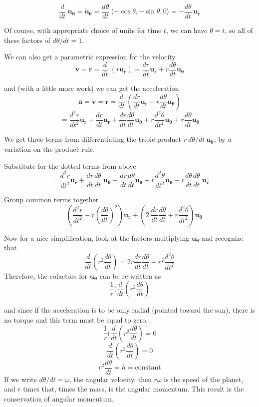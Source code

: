 \documentclass[11pt, oneside]{article}
\begin{document}
\[ \frac{d}{dt} \ \mathbf{u_{\theta}} = \dot{\mathbf{u}}_\mathbf{\theta} =  \frac{d\theta}{dt} \ \langle -\cos \theta, -\sin \theta, 0 \rangle = - \frac{d\theta}{dt} \ \mathbf{u_r} \]

Of course, with appropriate choice of units for time $t$, we can have $\theta = t$, so all of these factors of $d \theta/dt = 1$.

We can also get a parametric expression for the velocity
\[ \mathbf{v} = \dot{\mathbf{r}} = \frac{d}{dt} \ (r \mathbf{u_r}) = \frac{dr}{dt} \mathbf{u_r} + r \frac{d \theta}{dt}  \mathbf{u_{\theta}} \]

 and (with a little more work) we can get the acceleration
 \[ \mathbf{a} = \dot{\mathbf{v}} = \ddot{\mathbf{r}} = \frac{d}{dt} \ (\frac{dr}{dt} \mathbf{u_r} + r \frac{d \theta}{dt}  \mathbf{u_{\theta}}) \]
 \[ = \frac{d^2r}{dt^2} \mathbf{u_r} + \frac{dr}{dt} \dot{\mathbf{u}}_\mathbf{r} + \frac{dr}{dt} \frac{d \theta}{dt}  \mathbf{u_{\theta}} + r \frac{d^2\theta}{dt^2} \mathbf{u_{\theta}} + r \frac{d\theta}{dt} \dot{\mathbf{u}}_\mathbf{\theta}  \]
 
 We get three terms from differentiating the triple product $r \ d\theta/dt  \ \mathbf{u_{\theta}}$, by a variation on the product rule.  
 
 Substitute for the dotted terms from above
\[ = \frac{d^2r}{dt^2} \mathbf{u_r} + \frac{dr}{dt} \frac{d\theta}{dt} \ \mathbf{u_{\theta}} + \frac{dr}{dt} \frac{d \theta}{dt}  \mathbf{u_{\theta}} + r \frac{d^2\theta}{dt^2} \mathbf{u_{\theta}} - r \frac{d\theta}{dt} \frac{d\theta}{dt} \ \mathbf{u_r}  \]


Group common terms together
\[ = (\frac{d^2r}{dt^2} - r (\frac{d\theta}{dt})^2 ) \mathbf{u_r}  + (2 \ \frac{dr}{dt} \frac{d\theta}{dt} + r \frac{d^2\theta}{dt^2}) \mathbf{u_{\theta}}  \]

Now for a nice simplification, look at the factors multiplying $\mathbf{u_{\theta}}$ and recognize that
\[ \frac{d}{dt} ( r^2 \frac{d\theta}{dt}) = 2 r \frac{dr}{dt} \frac{d\theta}{dt} + r^2 \frac{d^2\theta}{dt^2}\]
Therefore, the cofactors for $\mathbf{u_{\theta}}$ can be re-written as
\[ \frac{1}{r} (\frac{d}{dt} ( r^2 \frac{d\theta}{dt}) \]

and since if the acceleration is to be only radial (pointed toward the sun), there is no torque and this term must be equal to zero.
\[ \frac{1}{r} (\frac{d}{dt} ( r^2 \frac{d\theta}{dt}) = 0 \]
\[ \frac{d}{dt} ( r^2 \frac{d\theta}{dt}) = 0 \]
\[ r^2 \frac{d\theta}{dt} = h = \text{constant} \]
If we write $d\theta/dt = \omega$, the angular velocity, then $r \omega$ is the speed of the planet, and $r$ times that, times the mass, is the angular momentum.  This result is the conservation of angular momentum.
\end{document}
